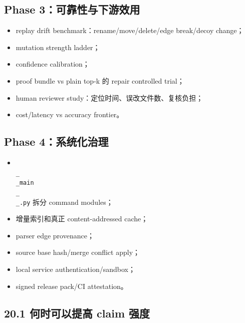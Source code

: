 \documentclass[UTF8,12pt,openany]{ctexbook}
\begin{document}
\subsection{Phase 3：可靠性与下游效用}

\begin{itemize}
\item replay drift benchmark：rename/move/delete/edge break/decoy change；
\item mutation strength ladder；
\item confidence calibration；
\item proof bundle vs plain top-k 的 repair controlled trial；
\item human reviewer study：定位时间、误改文件数、复核负担；
\item cost/latency vs accuracy frontier。
\end{itemize}

\subsection{Phase 4：系统化治理}

\begin{itemize}
\item \texttt{\\_\\_main\\_\\_.py} 拆分 command modules；
\item 增量索引和真正 content-addressed cache；
\item parser edge provenance；
\item source base hash/merge conflict apply；
\item local service authentication/sandbox；
\item signed release pack/CI attestation。
\end{itemize}

\subsection{20.1 何时可以提高 claim 强度}
\end{document}
